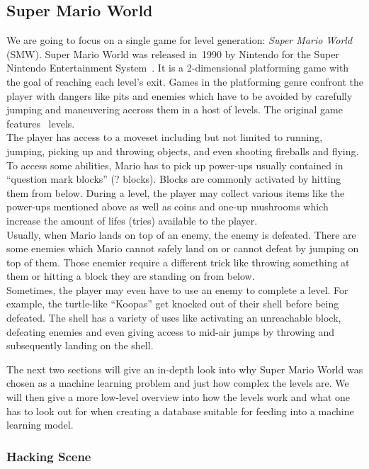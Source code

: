 \subsection{Super Mario World}

We are going to focus on a single game for level generation: \emph{Super
Mario World} (SMW). Super Mario World was released in~1990 by Nintendo
for the Super Nintendo Entertainment
System~\cite{SuperMarioWorld2019}. It is a 2-dimensional platforming
game with the goal of reaching each level's exit. Games in the
platforming genre confront the player with dangers like pits and
enemies which have to be avoided by carefully jumping and maneuvering
accross them in a host of levels. The original game features %
~levels. \\
The player has access to a moveset including but not limited to
running, jumping, picking up and throwing objects, and even shooting
fireballs and flying. To access some abilities, Mario has to pick up
power-ups usually contained in ``question mark blocks'' (? blocks).
Blocks are commonly activated by hitting them from below. During a
level, the player may collect various items like the power-ups
mentioned above as well as coins and one-up mushrooms which increase
the amount of lifes (tries) available to the player.
\\
Usually, when Mario lands on top of an enemy, the enemy is defeated.
There are some enemies which Mario cannot safely land on or cannot
defeat by jumping on top of them. Those enemier require a different
trick like throwing something at them or hitting a block they are
standing on from below. \\
Sometimes, the player may even have to use an enemy to complete a
level. For example, the turtle-like ``Koopas'' get knocked out of
their shell before being defeated. The shell has a variety of uses
like activating an unreachable block, defeating enemies and even
giving access to mid-air jumps by throwing and subsequently landing on
the shell.

The next two sections will give an in-depth look into why Super Mario
World was chosen as a machine learning problem and just how complex
the levels are. We will then give a more low-level overview into how
the levels work and what one has to look out for when creating a
database suitable for feeding into a machine learning model.

\subsubsection{Hacking Scene}

